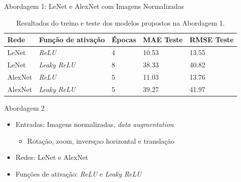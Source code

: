 \begin{frame}{Abordagem 1: LeNet e AlexNet com Imagens Normalizadas}
  \begin{table}[!ht]
		\caption{Resultados do treino e teste dos modelos propostos na Abordagem 1.}
		\label{tab:results-1}
		\begin{center}
			\begin{tabular}{l l l l l}
				\toprule
				Rede & Função de ativação & Épocas & MAE Teste & RMSE Teste \\
				\midrule
				LeNet & \emph{ReLU}  & 4 & 10.53 & 13.55 \\
				LeNet & \emph{Leaky ReLU} & 8 & 38.33 & 40.82 \\
				AlexNet & \emph{ReLU}  & 5 & 11.03 & 13.76 \\
				AlexNet & \emph{Leaky ReLU} & 5 & 39.27 & 41.97 \\
				\bottomrule
			\end{tabular}
		\end{center}
	\end{table}
\end{frame}





\begin{frame}{Abordagem 2}
 \begin{itemize}
   \item Entradas: Imagens normalizadas, \alert{\emph{data augmentation}}
   \begin{itemize}
     \item Rotação, zoom, inversçao horizontal e translação
   \end{itemize}
   \item Redes: LeNet e AlexNet
   \item Funções de ativação: \emph{ReLU} e \emph{Leaky ReLU}
   \end{itemize}
\end{frame}

